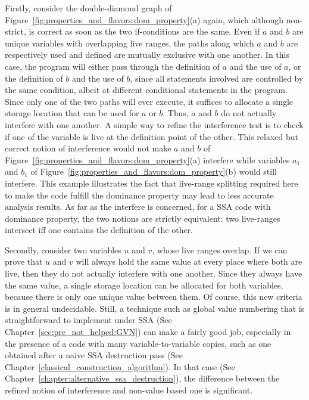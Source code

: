 Firstly, consider the double-diamond graph of Figure~\ref{fig:properties_and_flavors:dom_property}(a) again, which although non-strict, is correct as soon as the two if-conditions are the same.
Even if $a$ and $b$ are unique variables with overlapping live
ranges, the paths along which $a$ and $b$ are respectively used and
defined are mutually exclusive with one another. In this case, the
program will either pass through the definition of $a$ and the use
of $a$, or the definition of $b$ and the use of $b$, since all
statements involved are controlled by the same condition, albeit
at different conditional statements in the program. Since only
one of the two paths will ever execute, it suffices to allocate a 
single storage location that can be used for $a$ or $b$. Thus, $a$
and $b$ do not actually interfere with one another. A simple way to refine the interference test is to 
check if one of the variable is live at the definition point of the other. 
This relaxed but correct notion of interference would not make $a$ and $b$ of Figure~\ref{fig:properties_and_flavors:dom_property}(a) interfere while variables $a_1$ and $b_1$ of Figure~\ref{fig:properties_and_flavors:dom_property}(b) would still interfere. This example illustrates the fact that live-range splitting required here to make the code fulfill the dominance property may lead to less accurate analysis results.
As far as the interfere is concerned, for a SSA code with dominance property, the two notions are strictly equivalent: two live-ranges intersect iff one contains the definition of the other.  

Secondly, consider two variables $u$ and $v$, whose live ranges overlap.
If we can prove that $u$ and $v$ will always hold the same value
at every place where both are live, then they do not actually interfere
with one another. Since they always have the same value, a single 
storage location can be allocated for both variables, because there
is only one unique value between them. 
Of course, this new criteria is in general undecidable.
Still, a technique such as global value numbering that is straightforward to implement under SSA (See Chapter~\ref{sec:pre_not_helped:GVN}) can make a fairly good job, especially in the presence of a code with many variable-to-variable copies, such as one obtained after a naive 
SSA destruction pass (See Chapter~\ref{classical_construction_algorithm}).
In that case (See Chapter~\ref{chapter:alternative_ssa_destruction}), the difference between the refined notion of interference and non-value based one is significant. 

